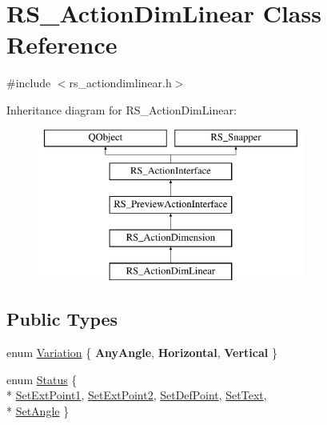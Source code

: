 \hypertarget{classRS__ActionDimLinear}{\section{R\-S\-\_\-\-Action\-Dim\-Linear Class Reference}
\label{classRS__ActionDimLinear}
}


{\ttfamily \#include $<$rs\-\_\-actiondimlinear.\-h$>$}

Inheritance diagram for R\-S\-\_\-\-Action\-Dim\-Linear\-:\begin{figure}[H]
\begin{center}
\leavevmode
\includegraphics[height=5.000000cm]{classRS__ActionDimLinear}
\end{center}
\end{figure}
\subsection*{Public Types}
\begin{DoxyCompactItemize}
\item 
enum \hyperlink{classRS__ActionDimLinear_aa4054f4dacf4b8b37c1fd83b86f9fc0f}{Variation} \{ {\bfseries Any\-Angle}, 
{\bfseries Horizontal}, 
{\bfseries Vertical}
 \}
\item 
enum \hyperlink{classRS__ActionDimLinear_abeef5d00bc33a2b97d5aaf6290c84949}{Status} \{ \\*
\hyperlink{classRS__ActionDimLinear_abeef5d00bc33a2b97d5aaf6290c84949abfb3608b391e14bf26648a64c05ec051}{Set\-Ext\-Point1}, 
\hyperlink{classRS__ActionDimLinear_abeef5d00bc33a2b97d5aaf6290c84949a743e7741e079a4e2cc87475a7f1b675f}{Set\-Ext\-Point2}, 
\hyperlink{classRS__ActionDimLinear_abeef5d00bc33a2b97d5aaf6290c84949a944e66ad3812207b27d95af24e73cb4b}{Set\-Def\-Point}, 
\hyperlink{classRS__ActionDimLinear_abeef5d00bc33a2b97d5aaf6290c84949a0af09e3b3b9e1da35f75ad7c417295cd}{Set\-Text}, 
\\*
\hyperlink{classRS__ActionDimLinear_abeef5d00bc33a2b97d5aaf6290c84949ac1bbfa8cba50c30c4b932f17c587fc9a}{Set\-Angle}
 \}
\end{DoxyCompactItemize}
